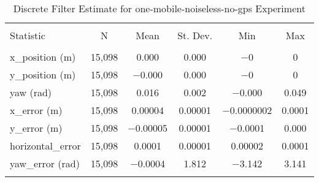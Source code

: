 
\begin{table}[h] \centering 
  \caption{Discrete Filter Estimate for one-mobile-noiseless-no-gps Experiment} 
  \label{tab:one_mobile_noiseless_no_gps_discrete_summary} 
\begin{tabular}{@{\extracolsep{5pt}}lccccc} 
\\[-1.8ex]\hline 
\hline \\[-1.8ex] 
Statistic & \multicolumn{1}{c}{N} & \multicolumn{1}{c}{Mean} & \multicolumn{1}{c}{St. Dev.} & \multicolumn{1}{c}{Min} & \multicolumn{1}{c}{Max} \\ 
\hline \\[-1.8ex] 
x\_position (m) & 15,098 & \num{0.000} & \num{0.000} & $-$0 & 0 \\ 
y\_position (m) & 15,098 & \num{-0.000} & \num{0.000} & $-$0 & 0 \\ 
yaw (rad) & 15,098 & \num{0.016} & \num{0.002} & \num{-0.000} & \num{0.049} \\ 
x\_error (m) & 15,098 & \num{0.00004} & \num{0.00001} & \num{-0.0000002} & \num{0.0001} \\ 
y\_error (m) & 15,098 & \num{-0.00005} & \num{0.00001} & \num{-0.0001} & \num{0.000} \\ 
horizontal\_error & 15,098 & \num{0.0001} & \num{0.00001} & \num{0.00002} & \num{0.0001} \\ 
yaw\_error (rad) & 15,098 & \num{-0.0004} & \num{1.812} & \num{-3.142} & \num{3.141} \\ 
\hline \\[-1.8ex] 
\end{tabular} 
\end{table} 

